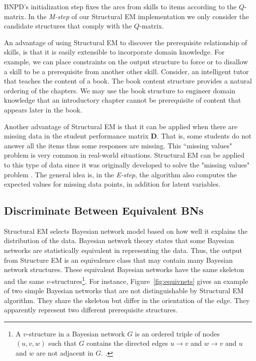 \documentclass{edm_template}
\begin{document}
BNPD's  initialization step
fixes the arcs from skills to items according to the ${Q}$-matrix.
In  the \emph{M-step} of our Structural EM implementation we only consider the candidate structures that comply with the ${Q}$-matrix.

An advantage of using Structural EM to discover the prerequisite relationship of skills, is that it is easily extensible to incorporate domain knowledge.
For example, we can  place constraints on the output structure to force or to disallow a skill to be a prerequisite from another other skill.
Consider,  an intelligent tutor that teaches the content of a book. 
The book content structure provides a natural ordering of the chapters. 
We may use the book structure to engineer domain knowledge that an introductory chapter cannot be prerequisite of content that appears later in the book.

Another advantage of Structural EM is that it can be applied when there are missing data in the student performance matrix $\mathbf{D}$. 
That is, some students do not answer all the items thus some responses are missing. This ``missing values" problem is very common in real-world situations.
Structural EM can be applied to this type of data since it was originally developed to solve the "missing values" problem \cite{friedman1997learning}.
The general idea is, in the \emph{E-step}, the algorithm also computes the expected values for missing data points, in addition for latent variables. 

\subsection{Discriminate Between Equivalent BNs}
\label{sec:discriminatebns}
Structural EM selects Bayesian network model based on how well it explains the distribution of the data. 
Bayesian network theory states that some Bayesian networks are statistically equivalent in representing the data.
Thus, the output from Structure EM is an equivalence class that may contain many Bayesian network structures.
These equivalent Bayesian networks have the same skeleton and the same $v$-structures\footnote{
A $v$-structure in a Bayesian network $G$ is an ordered triple of nodes $(u,v,w)$ such that $G$ contains the directed edges $u\rightarrow v$ and $w\rightarrow v$ and $u$ and $w$ are not adjacent in $G$. \cite{verma1990equivalence}.}. 
For instance, Figure~\ref{fig:equivnets} gives an example of two simple Bayesian networks that are not distinguishable by Structural EM algorithm.
They share the skeleton but differ in the orientation of the edge. They apparently represent two different prerequisite structures.
\end{document}
